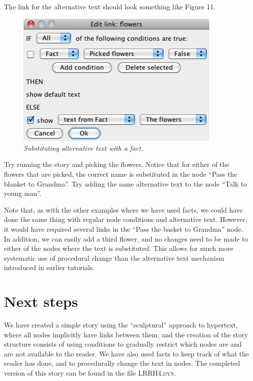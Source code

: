 \documentclass{article}
\begin{document}
The link for the alternative text should look something like Figure 11.

\begin{figure}[h]
  \centering
  \includegraphics[width=10cm]{images/hypedyn-tutorial-3-figure-11}
  \caption{\textit{Substituting alternative text with a fact.}}
\end{figure}

Try running the story and picking the flowers. Notice that for either of the
flowers that are picked, the correct name is substituted in the node ``Pass the
blanket to Grandma''. Try adding the same alternative text to the node ``Talk
to young man''.

Note that, as with the other examples where we have used facts, we could have
done the same thing with regular node conditions and alternative text. However,
it would have required several links in the ``Pass the basket to Grandma''
node. In addition, we can easily add a third flower, and no changes need to be
made to either of the nodes where the text is substituted. This allows for much
more systematic use of procedural change than the alternative text mechanism
introduced in earlier tutorials.

\section{Next steps}

We have created a simple story using the ``sculptural'' approach to hypertext,
where all nodes implicitly have links between them, and the creation of the
story structure consists of using conditions to gradually restrict which nodes
are and are not available to the reader. We have also used facts to keep track
of what the reader has done, and to procedurally change the text in nodes. The
completed version of this story can be found in the file \textsc{LRRH4.dyn}.
\end{document}
